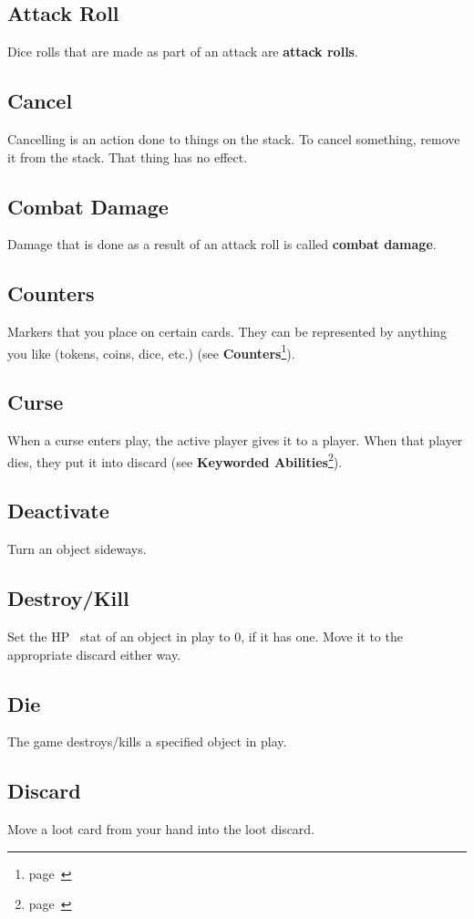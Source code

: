 \documentclass[
  fontsize=10pt,
  paper=a5,
  version=last,
  chapterprefix=true,
  bindingoffset=5mm,
  ]{scrbook}
\newcommand*{\inlineicon}[1]{%
    \raisebox{-.3\baselineskip}{%
        \smash{%
            \texttt{[image: \#1]}%
        }%
    }%
}
\newcommand{\heart}{\inlineicon{./assets/ms-heart.png}}
\begin{document}
    \subsection*{Attack Roll}
    Dice rolls that are made as part of an attack are \textbf{attack rolls}.
    \subsection*{Cancel}
    Cancelling is an action done to things on the stack. To cancel something, remove it from the stack. That thing has no effect.
    \subsection*{Combat Damage}
    Damage that is done as a result of an attack roll is called \textbf{combat damage}.
    \subsection*{Counters}
    Markers that you place on certain cards. They can be represented by anything you like (tokens, coins, dice, etc.) (see \textbf{Counters}\footnote{page~\pageref{counters}}).
    \subsection*{Curse}
    When a curse enters play, the active player gives it to a player. When that player dies, they put it into discard (see \textbf{Keyworded Abilities}\footnote{page~\pageref{keyworded}}).
    \subsection*{Deactivate}
    Turn an object sideways.
    \subsection*{Destroy/Kill}
    Set the HP\heart\ stat of an object in play to 0, if it has one. Move it to the appropriate discard either way.
    \subsection*{Die}
    The game destroys/kills a specified object in play.
    \subsection*{Discard}
    Move a loot card from your hand into the loot discard.
\end{document}

